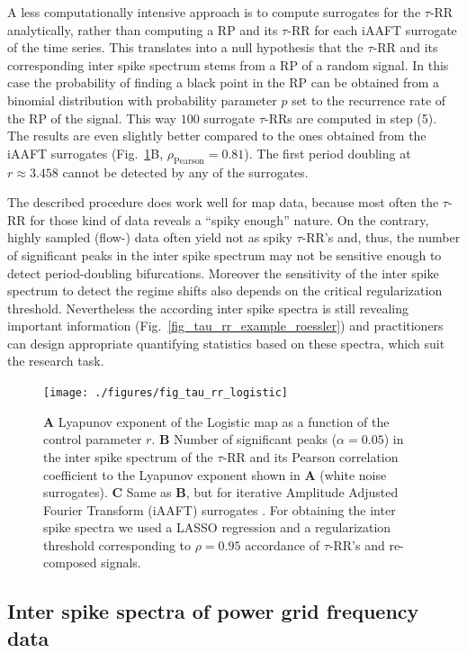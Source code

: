 \documentclass[entropy,article,submit,pdftex,moreauthors]{Definitions/mdpi}
\begin{document}
A less computationally intensive approach is to compute surrogates for the $\tau$-RR analytically, rather than computing a RP and its $\tau$-RR for each iAAFT surrogate of the 
time series. This translates into a null hypothesis 
that the $\tau$-RR and its corresponding inter spike spectrum stems from a RP of a random signal. In this case the probability of finding a black point in the RP can be obtained 
from a binomial distribution with probability parameter $p$ set to the recurrence rate of the RP of the signal. This way $100$ surrogate $\tau$-RRs are computed in step (5). 
The results are even slightly better compared to the ones obtained from the iAAFT surrogates (Fig.~\ref{fig_tau_rr_logistic}B, $\rho_{\text{Pearson}}=0.81$). The first period doubling at 
$r \approx 3.458$ cannot be detected by any of the surrogates.

The described procedure does work well for map data, because most often the $\tau$-RR for those kind of data reveals a ``spiky enough'' nature. 
On the contrary, highly sampled (flow-) data often yield not as 
spiky $\tau$-RR's and, thus, the number of significant peaks in the inter spike spectrum may not be sensitive enough to detect period-doubling bifurcations. Moreover the sensitivity of the 
inter spike spectrum to detect the regime shifts also depends on the critical regularization threshold. Nevertheless the 
according inter spike spectra is still revealing important information (Fig.~\ref{fig_tau_rr_example_roessler}) and practitioners can design appropriate quantifying statistics based 
on these spectra, which suit the 
research task.

\begin{figure}
 \centering
 \texttt{[image: ./figures/fig\_tau\_rr\_logistic]}
 \caption{\textbf{A} Lyapunov exponent of the Logistic map as a function of the control parameter $r$. 
 \textbf{B} Number of significant peaks ($\alpha=0.05$) in the inter spike spectrum of the $\tau$-RR and its Pearson correlation coefficient to the Lyapunov exponent shown in \textbf{A} 
 (white noise surrogates). 
 \textbf{C} Same as \textbf{B}, but for iterative Amplitude Adjusted Fourier Transform (iAAFT) surrogates \cite{Schreiber1996,Schreiber2000}. For obtaining the inter spike spectra we used 
 a LASSO regression and a regularization threshold corresponding to $\rho=0.95$ accordance of $\tau$-RR's and re-composed signals.  
}
\label{fig_tau_rr_logistic}
\end{figure}

\subsection{Inter spike spectra of power grid frequency data}
\end{document}
